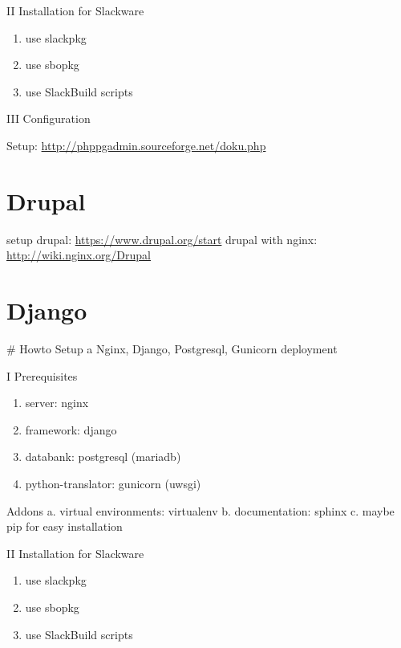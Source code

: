 \documentclass[letterpaper,10pt,english]{sphinxmanual}
\begin{document}
II Installation for Slackware
\begin{enumerate}
\item {} 
use slackpkg

\item {} 
use sbopkg

\item {} 
use SlackBuild scripts

\end{enumerate}

III Configuration

Setup: \href{http://phppgadmin.sourceforge.net/doku.php}{http://phppgadmin.sourceforge.net/doku.php}


\section{Drupal}
\label{sdocs/drupal/drupal:drupal}\label{sdocs/drupal/drupal::doc}
setup drupal: \href{https://www.drupal.org/start}{https://www.drupal.org/start}
drupal with nginx: \href{http://wiki.nginx.org/Drupal}{http://wiki.nginx.org/Drupal}


\section{Django}
\label{sdocs/django/django::doc}\label{sdocs/django/django:django}
\# Howto Setup a Nginx, Django, Postgresql, Gunicorn deployment

I Prerequisites
\begin{enumerate}
\item {} 
server: nginx

\item {} 
framework: django

\item {} 
databank: postgresql (mariadb)

\item {} 
python-translator: gunicorn (uwsgi)

\end{enumerate}

Addons
a. virtual environments: virtualenv
b. documentation: sphinx
c. maybe pip for easy installation

II Installation for Slackware
\begin{enumerate}
\item {} 
use slackpkg

\item {} 
use sbopkg

\item {} 
use SlackBuild scripts

\end{enumerate}
\end{document}
